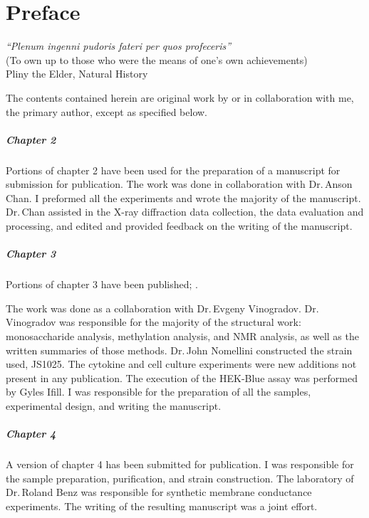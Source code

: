 
\chapter{Preface}
\begin{epigraph} 
\textit{``Plenum ingenni pudoris fateri per quos profeceris''}\\
(To own up to those who were the means of one's own achievements)\\
Pliny the Elder, Natural History
\end{epigraph} 

The contents contained herein are original work by or in collaboration with me,
the primary author, except as specified below.

\paragraph{Chapter 2} 
Portions of chapter 2 have been used for the preparation of a manuscript for
submission for publication. The work was done in collaboration with Dr.\,Anson
Chan. I preformed all the experiments and wrote the majority of the
manuscript. Dr.\,Chan assisted in the X-ray diffraction data collection, the
data evaluation and processing, and edited and provided feedback on the writing
of the manuscript. 

\paragraph{Chapter 3}
Portions of chapter 3 have been published;
\makeatletter%
%
\bgroup%
  \def\blx@maxcitenames{99}%
  \makeatother%
  .
\egroup%

\makeatletter
{}
\makeatother
 The work was
done as a collaboration with Dr.\,Evgeny Vinogradov. Dr.\,Vinogradov was
responsible for the majority of the structural work: monosaccharide analysis,
methylation analysis, and \textsc{NMR} analysis, as well as the written
summaries of those methods. Dr.\,John Nomellini constructed the strain used,
JS1025. The cytokine and cell culture experiments were new additions not present
in any publication. The execution of the HEK-Blue assay was performed by Gyles Ifill. I was
responsible for the preparation of all the samples, experimental design, and
writing the manuscript. 

\paragraph{Chapter 4}
A version of chapter 4 has been submitted for publication. I was responsible for
the sample preparation, purification, and strain construction. The laboratory of
Dr.\,Roland Benz was responsible for synthetic membrane conductance experiments.
The writing of the resulting manuscript was a joint effort.
